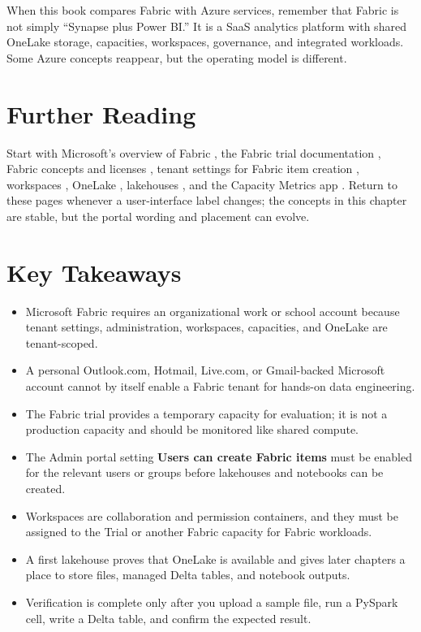 \begin{notebox}
When this book compares Fabric with Azure services, remember that Fabric is not simply ``Synapse plus Power BI.'' It is a SaaS analytics platform with shared OneLake storage, capacities, workspaces, governance, and integrated workloads. Some Azure concepts reappear, but the operating model is different.
\end{notebox}

\section{Further Reading}
Start with Microsoft's overview of Fabric \cite{microsoftFabricOverview}, the Fabric trial documentation \cite{microsoftFabricTrial}, Fabric concepts and licenses \cite{microsoftFabricCapacity}, tenant settings for Fabric item creation \cite{microsoftFabricTenantSettings}, workspaces \cite{microsoftFabricWorkspaces}, OneLake \cite{microsoftOneLakeOverview}, lakehouses \cite{microsoftFabricLakehouse}, and the Capacity Metrics app \cite{microsoftFabricMetricsApp}. Return to these pages whenever a user-interface label changes; the concepts in this chapter are stable, but the portal wording and placement can evolve.

\section*{Key Takeaways}
\begin{itemize}
    \item Microsoft Fabric requires an organizational work or school account because tenant settings, administration, workspaces, capacities, and OneLake are tenant-scoped.
    \item A personal Outlook.com, Hotmail, Live.com, or Gmail-backed Microsoft account cannot by itself enable a Fabric tenant for hands-on data engineering.
    \item The Fabric trial provides a temporary capacity for evaluation; it is not a production capacity and should be monitored like shared compute.
    \item The Admin portal setting \textbf{Users can create Fabric items} must be enabled for the relevant users or groups before lakehouses and notebooks can be created.
    \item Workspaces are collaboration and permission containers, and they must be assigned to the Trial or another Fabric capacity for Fabric workloads.
    \item A first lakehouse proves that OneLake is available and gives later chapters a place to store files, managed Delta tables, and notebook outputs.
    \item Verification is complete only after you upload a sample file, run a PySpark cell, write a Delta table, and confirm the expected result.
\end{itemize}

